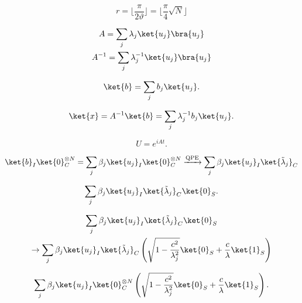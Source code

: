 \begin{equation}

r = 
\Big\lfloor \frac{\pi}{2\vartheta} \Big\rfloor 
=
\Big\lfloor \frac{\pi}{4} \sqrt{N} \Big\rfloor
\end{equation}

\begin{gather}

A = \sum_j \lambda_j\ket{u_j}\bra{u_j} \\
A^{-1} = \sum_j \lambda_j^{-1}\ket{u_j}\bra{u_j}
\end{gather}

\begin{equation}

\ket{b} = \sum_j b_j\ket{u_j}.
\end{equation}

\begin{equation}

\ket{x} = A^{-1} \ket{b} = \sum_j \lambda_j^{-1}b_j\ket{u_j}.
\end{equation}

\begin{equation}

U = e^{iAt}.
\end{equation}

\begin{equation}

\ket{b}_I \ket{0}^{\otimes N}_C = 
\sum_j \beta_j \ket{u_j}_I \ket{0}^{\otimes N}_C
\xrightarrow[]{\text{QPE}}
\sum_j \beta_j \ket{u_j}_I \ket{\tilde{\lambda}_j}_C
\end{equation}

\begin{equation}

\sum_j \beta_j \ket{u_j}_I \ket{\tilde{\lambda}_j}_C \ket{0}_S.
\end{equation}

\begin{gather}

\sum_j \beta_j \ket{u_j}_I \ket{\tilde{\lambda}_j}_C \ket{0}_S \nonumber\\
\to
\sum_j \beta_j \ket{u_j}_I \ket{\tilde{\lambda}_j}_C 
\left( 
\sqrt{1-\frac{c^2}{\lambda_j^2}}\ket{0}_S + \frac{c}{\lambda}\ket{1}_S
\right)
\end{gather}

\begin{equation}

\sum_j \beta_j \ket{u_j}_I \ket{0}^{\otimes N}_C 
\left( 
\sqrt{1-\frac{c^2}{\lambda_j^2}}\ket{0}_S + \frac{c}{\lambda}\ket{1}_S
\right).
\end{equation}

